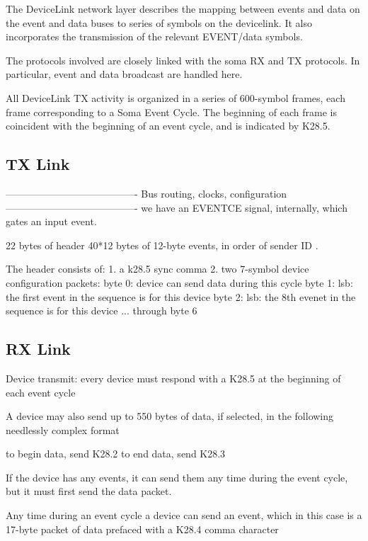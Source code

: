 
The DeviceLink network layer describes the mapping between events and data on the event and data buses to series of symbols on the devicelink. It also incorporates the transmission of the relevant EVENT/data symbols. 

The protocols involved are closely linked with the soma RX and TX protocols. In particular, event and data broadcast are handled here. 


All DeviceLink TX activity is organized in a series of 600-symbol frames, each frame corresponding to a Soma Event Cycle. The beginning of each frame is coincident with the beginning of an event cycle, and is indicated by K28.5. 


\subsection{TX Link} 


----------------------------------------
Bus routing, clocks, configuration
----------------------------------------
we have an EVENTCE signal, internally, which gates an input event. 

22 bytes of header
40*12 bytes of 12-byte events, in order of sender ID .

The header consists of:
1. a k28.5 sync comma
2. two 7-symbol device configuration packets:
byte 0: device can send data during this cycle
byte 1: lsb: the first event in the sequence is for this device
byte 2: lsb: the 8th evenet in the sequence is for this device
... through byte 6


\subsection{RX Link}

Device transmit:
every device must respond with a K28.5 at the beginning of each event cycle

A device may also send up to 550 bytes of data, if selected, in the following needlessly complex format

to begin data, send K28.2
to end data, send K28.3

If the device has any events, it can send them any time during the event cycle, but it must first send the data packet. 


Any time during an event cycle a device can send an event, which in
this case is a 17-byte packet of data prefaced with a K28.4 comma
character

